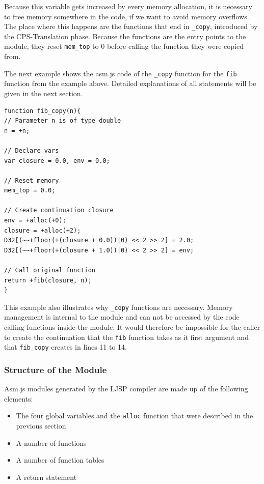 \documentclass[11pt]{report}
\begin{document}

Because this variable gets increased by every memory allocation, it is necessary to free memory somewhere in the code, if we want to avoid memory overflows. The place where this happens are the functions that end in \texttt{_copy}, introduced by the CPS-Translation phase. Because the functions are the entry points to the module, they reset \texttt{mem_top} to $0$ before calling the function they were copied from.

The next example shows the asm.js code of the \texttt{_copy} function for the \texttt{fib} function from the example above. Detailed explanations of all statements will be given in the next section.

\begin{lstlisting}
function fib_copy(n){
// Parameter n is of type double
n = +n;

// Declare vars
var closure = 0.0, env = 0.0;

// Reset memory
mem_top = 0.0;

// Create continuation closure
env = +alloc(+0);
closure = +alloc(+2);
D32[(~~+floor(+(closure + 0.0))|0) << 2 >> 2] = 2.0;
D32[(~~+floor(+(closure + 1.0))|0) << 2 >> 2] = env;

// Call original function
return +fib(closure, n);
}
\end{lstlisting}

This example also illustrates why \texttt{_copy} functions are necessary. Memory management is internal to the module and can not be accessed by the code calling functions inside the module. It would therefore be impossible for the caller to create the continuation that the \texttt{fib} function takes as it first argument and that \texttt{fib_copy} creates in lines 11 to 14.

\subsubsection{Structure of the Module}

Asm.js modules generated by the LJSP compiler are made up of the following elements:
\begin{itemize}
\item The four global variables and the \texttt{alloc} function that were described in the previous section
\item A number of functions
\item A number of function tables
\item A return statement
\end{itemize}
\end{document}
